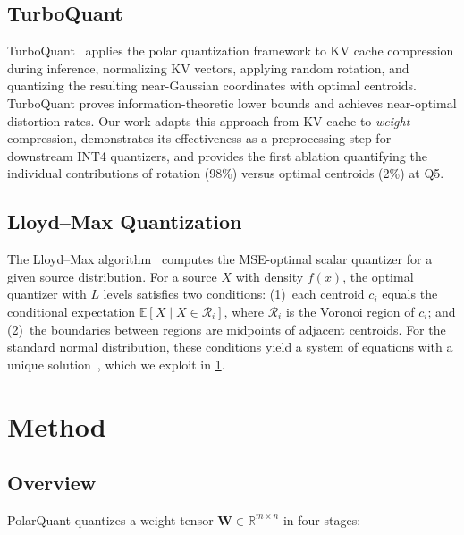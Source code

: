 \documentclass[10pt,twocolumn]{article}
\newcommand{\R}{\mathbb{R}}
\newcommand{\E}{\mathbb{E}}
\newcommand{\bW}{\mathbf{W}}
\begin{document}
\subsection{TurboQuant}
\label{sec:turboquant}

TurboQuant~\cite{ashkboos2025turboquant} applies the polar quantization framework to KV cache compression during inference, normalizing KV vectors, applying random rotation, and quantizing the resulting near-Gaussian coordinates with optimal centroids. TurboQuant proves information-theoretic lower bounds and achieves near-optimal distortion rates. Our work adapts this approach from KV cache to \emph{weight} compression, demonstrates its effectiveness as a preprocessing step for downstream INT4 quantizers, and provides the first ablation quantifying the individual contributions of rotation (98\%) versus optimal centroids (2\%) at Q5.

\subsection{Lloyd--Max Quantization}
\label{sec:lloydmax_bg}

The Lloyd--Max algorithm~\cite{lloyd1982least, max1960quantizing} computes the MSE-optimal scalar quantizer for a given source distribution. For a source $X$ with density $f(x)$, the optimal quantizer with $L$ levels satisfies two conditions: (1)~each centroid $c_i$ equals the conditional expectation $\E[X \mid X \in \mathcal{R}_i]$, where $\mathcal{R}_i$ is the Voronoi region of $c_i$; and (2)~the boundaries between regions are midpoints of adjacent centroids. For the standard normal distribution, these conditions yield a system of equations with a unique solution~\cite{gray1998quantization}, which we exploit in \cref{sec:method}.

\section{Method}
\label{sec:method}

\subsection{Overview}
\label{sec:overview}

PolarQuant quantizes a weight tensor $\bW \in \R^{m \times n}$ in four stages:
\end{document}

